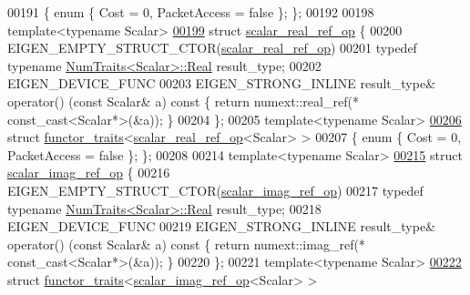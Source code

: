 \begin{DoxyCode}
00191 \{ \textcolor{keyword}{enum} \{ Cost = 0, PacketAccess = \textcolor{keyword}{false} \}; \};
00192 
00198 \textcolor{keyword}{template}<\textcolor{keyword}{typename} Scalar>
\hyperlink{struct_eigen_1_1internal_1_1scalar__real__ref__op}{00199} \textcolor{keyword}{struct }\hyperlink{struct_eigen_1_1internal_1_1scalar__real__ref__op}{scalar\_real\_ref\_op} \{
00200   EIGEN\_EMPTY\_STRUCT\_CTOR(\hyperlink{struct_eigen_1_1internal_1_1scalar__real__ref__op}{scalar\_real\_ref\_op})
00201   \textcolor{keyword}{typedef} \textcolor{keyword}{typename} \hyperlink{group___core___module_struct_eigen_1_1_num_traits}{NumTraits<Scalar>::Real} result\_type;
00202   EIGEN\_DEVICE\_FUNC
00203   EIGEN\_STRONG\_INLINE result\_type& operator() (\textcolor{keyword}{const} Scalar& a)\textcolor{keyword}{ const }\{ \textcolor{keywordflow}{return} numext::real\_ref(*
      const\_cast<Scalar*>(&a)); \}
00204 \};
00205 \textcolor{keyword}{template}<\textcolor{keyword}{typename} Scalar>
\hyperlink{struct_eigen_1_1internal_1_1functor__traits_3_01scalar__real__ref__op_3_01_scalar_01_4_01_4}{00206} \textcolor{keyword}{struct }\hyperlink{struct_eigen_1_1internal_1_1functor__traits}{functor\_traits}<\hyperlink{struct_eigen_1_1internal_1_1scalar__real__ref__op}{scalar\_real\_ref\_op}<Scalar> >
00207 \{ \textcolor{keyword}{enum} \{ Cost = 0, PacketAccess = \textcolor{keyword}{false} \}; \};
00208 
00214 \textcolor{keyword}{template}<\textcolor{keyword}{typename} Scalar>
\hyperlink{struct_eigen_1_1internal_1_1scalar__imag__ref__op}{00215} \textcolor{keyword}{struct }\hyperlink{struct_eigen_1_1internal_1_1scalar__imag__ref__op}{scalar\_imag\_ref\_op} \{
00216   EIGEN\_EMPTY\_STRUCT\_CTOR(\hyperlink{struct_eigen_1_1internal_1_1scalar__imag__ref__op}{scalar\_imag\_ref\_op})
00217   \textcolor{keyword}{typedef} \textcolor{keyword}{typename} \hyperlink{group___core___module_struct_eigen_1_1_num_traits}{NumTraits<Scalar>::Real} result\_type;
00218   EIGEN\_DEVICE\_FUNC
00219   EIGEN\_STRONG\_INLINE result\_type& operator() (\textcolor{keyword}{const} Scalar& a)\textcolor{keyword}{ const }\{ \textcolor{keywordflow}{return} numext::imag\_ref(*
      const\_cast<Scalar*>(&a)); \}
00220 \};
00221 \textcolor{keyword}{template}<\textcolor{keyword}{typename} Scalar>
\hyperlink{struct_eigen_1_1internal_1_1functor__traits_3_01scalar__imag__ref__op_3_01_scalar_01_4_01_4}{00222} \textcolor{keyword}{struct }\hyperlink{struct_eigen_1_1internal_1_1functor__traits}{functor\_traits}<\hyperlink{struct_eigen_1_1internal_1_1scalar__imag__ref__op}{scalar\_imag\_ref\_op}<Scalar> >

\end{DoxyCode}
